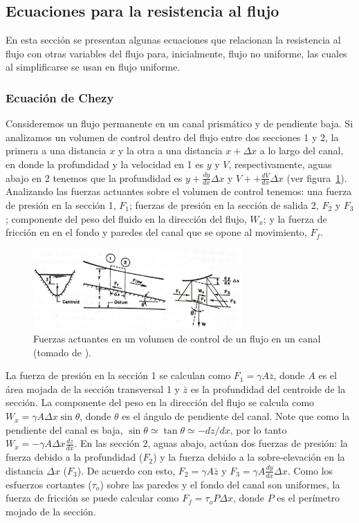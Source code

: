 \documentclass[11pt, oneside]{article}
\begin{document}
\subsection{Ecuaciones para la resistencia al flujo}
En esta secci\'on se presentan algunas ecuaciones que relacionan la resistencia al flujo con otras variables del flujo para, inicialmente, flujo no uniforme, las cuales al simplificarse se usan en flujo uniforme. 

\subsubsection{Ecuaci\'on de Chezy}
Consideremos un flujo permanente en un canal prismático y de pendiente baja. Si analizamos un volumen de control dentro del flujo entre dos secciones 1 y 2, la primera a una distancia $x$ y la otra a una distancia $x + \Delta x$ a lo largo del canal, en donde la profundidad y la velocidad en 1 es $y$ y $V$, respectivamente, aguas abajo en 2 tenemos que la profundidad es $y + \frac{dy}{dx} \Delta x$ y $V + + \frac{dV}{dx} \Delta x$ (ver figura~\ref{fig2}). Analizando las fuerzas actuantes sobre el volumen de control tenemos: una fuerza de presi\'on en la secci\'on 1, $F_1$; fuerzas de presi\'on en la secci\'on de salida 2, $F_2$ y $F_3$; componente del peso del fluido en la direcci\'on del flujo, $W_x$; y la fuerza de fricci\'on en en el fondo y paredes del canal que se opone al movimiento, $F_f$. 

\begin{figure}[h]
\centering
\includegraphics[width=8cm]{fig42.jpeg}
\caption{Fuerzas actuantes en un volumen de control de un flujo en un canal (tomado de \cite{Chau}).}
\label{fig2}
\end{figure}

La  fuerza de presi\'on en la secci\'on 1 se calculan como $F_1 = \gamma A \bar{z}$, donde $A$ es el \'area mojada de la secci\'on transversal 1 y $\bar{z}$ es la profundidad del centroide de la secci\'on. La componente del peso en la direcci\'on del flujo se calcula como $W_x = \gamma A \Delta x \sin \theta$, donde $\theta$ es el \'angulo de pendiente del canal. Note que como la pendiente del canal es baja, $\sin \theta \simeq \tan \theta \simeq  -dz/dx$, por lo tanto $W_x = -\gamma A \Delta x \frac{dz}{dx}$. En las secci\'on 2, aguas abajo, act\'uan dos fuerzas de presi\'on: la fuerza debido a la profundidad ($F_2$) y la fuerza debido a la sobre-elevaci\'on en la distancia $\Delta x$ ($F_3$). De acuerdo con esto, $F_2 = \gamma A \bar{z}$ y $F_3 = \gamma A \frac{dy}{dx} \Delta x$. Como los esfuerzos cortantes ($\tau_o$) sobre las paredes y el fondo del canal son uniformes, la fuerza de fricci\'on se puede calcular como $F_f = \tau_o P \Delta x$, donde $P$ es el perímetro mojado de la secci\'on. 
\end{document}
